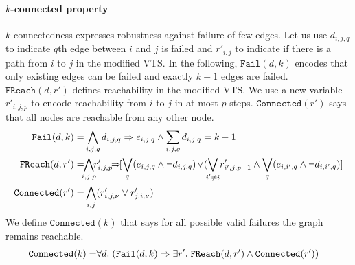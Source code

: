 \paragraph{$k$-connected property}
%
$k$-connectedness expresses robustness against failure of few edges.
%
Let us use $d_{i,j,q}$ to indicate $q$th edge between $i$ and $j$ is failed
and $r'_{i,j}$ to indicate if there is a path from $i$ to $j$ in
the modified VTS.
%
%
In the following, $\texttt{Fail}(d,k)$ encodes that only
existing edges can be failed and exactly $k-1$ edges are failed.
%
$\texttt{FReach}(d,r')$ defines reachability in the modified VTS.
%
We use a new variable $r'_{i,j,p}$ to encode reachability from
$i$ to $j$ in at most $p$ steps.
%
$\texttt{Connected}(r')$ says that all nodes are reachable from any
other node.
\begin{align*}
\texttt{Fail}(d,k) = & 
\bigwedge\limits_{i,j,q} d_{i,j,q} \limplies e_{i,j,q}  \land 
\sum_{i,j,q} d_{i,j,q} = k-1\\
\texttt{FReach}(d,r') = &\hspace{-1ex}
\bigwedge\limits_{i,j,p}  \hspace{-1ex}r^{\prime}_{i,j,p} \hspace{-1ex}\limplies\hspace{-1ex} [\bigvee_{q} (e_{i,j,q} \land  \neg d_{i,j,q}) \hspace{-1pt}\lor \hspace{-2pt} (\bigvee_{\mathclap{i' \neq i}}  r^{\prime}_{i',j,p-1} \land  \bigvee_{q} (e_{i,i',q} \land \neg d_{i,i',q}) ]\\
\texttt{Connected}(r') = & \Land\limits_{i,j} (r^{\prime}_{i,j,\nu} \lor r^{\prime}_{j,i,\nu})
\end{align*}
%
We define $\texttt{Connected}(k)$ that says for all possible valid failures
the graph remains reachable. 
\begin{align*}
\texttt{Connected}(k) = & \forall d.\;
(\texttt{Fail}(d,k) \Rightarrow \exists r'.\;\texttt{FReach}(d,r')
\land \texttt{Connected}(r'))
\end{align*}
